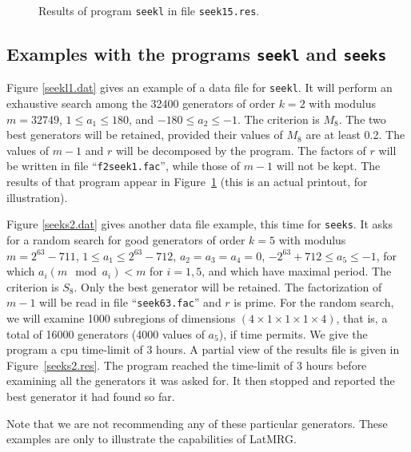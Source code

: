 \begin{figure}[hbt] 
\centerline {}
\caption { Results of program {\tt seekl} in file {\tt seek15.res}. }
\label {seekl1.res}
\end{figure}


\subsection {Examples with the programs {\tt seekl} and {\tt seeks}}

Figure \ref{seekl1.dat} gives an example of a data file for {\tt seekl}.
It will perform an exhaustive search among the 32400 generators of order
$k=2$ with modulus $m= 32749$, $1\le a_1\le 180$, and $-180\le a_2\le -1$.
The criterion is $M_8$.
The two best generators
will be retained, provided their values of $M_8$ are at least 0.2.
The values of $m-1$ and $r$ will be decomposed by the program.
The factors of $r$ will be written in file ``{\tt f2seek1.fac}'',
while those of $m-1$ will not be kept.
The results of that program appear in Figure~\ref{seekl1.res}
(this is an actual printout, for illustration).

Figure \ref{seeks2.dat} gives another data file example, this time
for {\tt seeks}.
It asks for a random search for good generators of order
$k=5$ with modulus $m= 2^{63} - 711$, $1\le a_1\le 2^{63}-712$,
$a_2 = a_3 = a_4 = 0$, $-2^{63}+712\le a_5\le -1$, for which
$a_i (m\mod a_i) < m$ for $i=1,5$, and which have maximal period.
The criterion is $S_8$.
Only the best generator will be retained.
The factorization of $m-1$ will be read in file ``{\tt seek63.fac}'' and
$r$ is prime.
For the random search, we will examine 1000 subregions of dimensions
$(4\times 1\times 1\times 1\times 4)$, that is, a total of 16000 generators
(4000 values of $a_5$), if time permits.
We give the program a cpu time-limit of 3 hours.
A partial view of the results file is given in Figure~\ref{seeks2.res}.
The program reached the time-limit of 3 hours before examining
all the generators it was asked for.
It then stopped and reported the best generator it had found so far.

Note that we are not recommending any of these particular generators.
These examples are only to illustrate the capabilities of LatMRG.

